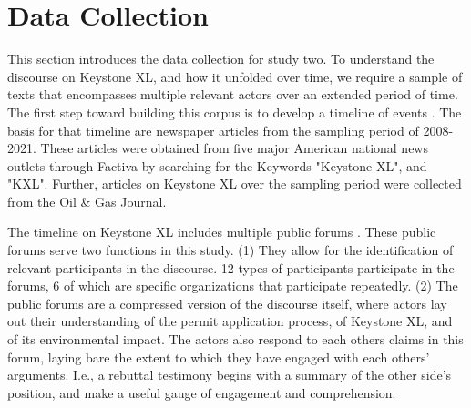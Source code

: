 
\section*{Data Collection}\label{sec:data}


This section introduces the data collection for study two. To understand the discourse on Keystone XL, and how it unfolded over time, we require a sample of texts that encompasses multiple relevant actors over an extended period of time. The first step toward building this corpus is to develop a timeline of events \citep{Maguire2009}. The basis for that timeline are newspaper articles from the sampling period of 2008-2021. These articles were obtained from five major American national news outlets
through Factiva by searching for the Keywords "Keystone XL", and "KXL". Further, articles on Keystone XL over the sampling period were collected from the Oil \& Gas Journal. 

% 

The timeline on Keystone XL includes multiple public forums \citep{Latour2005}. These public forums serve two functions in this study. (1) They allow for the identification of relevant participants in the discourse. 12 types of participants participate in the forums, 6 of which are specific organizations that participate repeatedly. 
(2) The public forums are a compressed version of the discourse itself, where actors lay out their understanding of the permit application process, of Keystone XL, and of its environmental impact. The actors also respond to each others claims in this forum, laying bare the extent to which they have engaged with each others' arguments. I.e., a rebuttal testimony begins with a summary of the other side's position, and make a useful gauge of engagement and comprehension.

